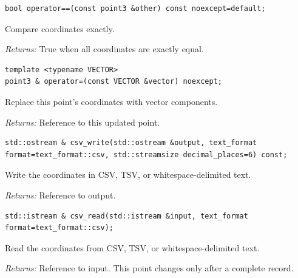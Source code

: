 \par\noindent\begin{minipage}{\linewidth}
\begin{lstlisting}[style=apireference]
bool operator==(const point3 &other) const noexcept=default;
\end{lstlisting}
{\footnotesize Compare coordinates exactly.\par}
{\footnotesize\textit{Returns:} True when all coordinates are exactly equal.\par}
\end{minipage}\par\vspace{1pt}
\par\noindent\begin{minipage}{\linewidth}
\begin{lstlisting}[style=apireference]
template <typename VECTOR>
point3 & operator=(const VECTOR &vector) noexcept;
\end{lstlisting}
{\footnotesize Replace this point's coordinates with vector components.\par}
{\footnotesize\textit{Returns:} Reference to this updated point.\par}
\end{minipage}\par\vspace{1pt}
\par\noindent\begin{minipage}{\linewidth}
\begin{lstlisting}[style=apireference]
std::ostream & csv_write(std::ostream &output, text_format format=text_format::csv, std::streamsize decimal_places=6) const;
\end{lstlisting}
{\footnotesize Write the coordinates in CSV, TSV, or whitespace-delimited text.\par}
{\footnotesize\textit{Returns:} Reference to output.\par}
\end{minipage}\par\vspace{1pt}
\par\noindent\begin{minipage}{\linewidth}
\begin{lstlisting}[style=apireference]
std::istream & csv_read(std::istream &input, text_format format=text_format::csv);
\end{lstlisting}
{\footnotesize Read the coordinates from CSV, TSV, or whitespace-delimited text.\par}
{\footnotesize\textit{Returns:} Reference to input. This point changes only after a complete record.\par}
\end{minipage}\par\vspace{1pt}
